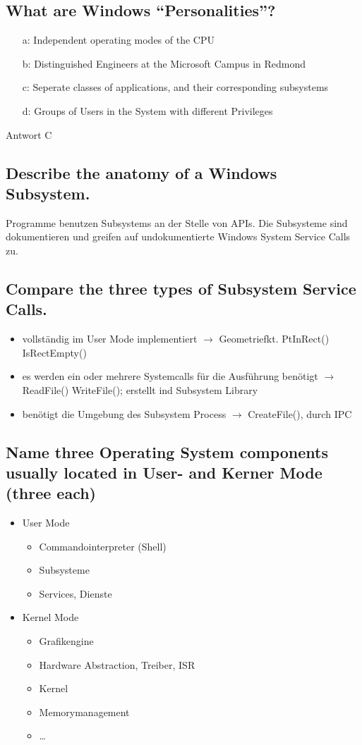 \subsection{What are Windows ``Personalities''?}
\begin{enumerate}
	\item[a:] Independent operating modes of the CPU
	\item[b:] Distinguished Engineers at the Microsoft Campus in Redmond
	\item[c:] Seperate classes of applications, and their corresponding subsystems
	\item[d:] Groups of Users in the System with different Privileges
\end{enumerate}
Antwort C

\subsection{Describe the anatomy of a Windows Subsystem.}
Programme benutzen Subsystems an der Stelle von APIs. Die Subsysteme sind dokumentieren und greifen auf undokumentierte Windows System Service Calls zu.

\subsection{Compare the three types of Subsystem Service Calls.}
\begin{itemize}
	\setlength\itemsep{-0.5em}
	\item vollst\"andig im User Mode implementiert $\rightarrow$ Geometriefkt. PtInRect() IsRectEmpty()
	\item es werden ein oder mehrere Systemcalls f\"ur die Ausf\"uhrung ben\"otigt $\rightarrow$ ReadFile() WriteFile(); erstellt ind Subsystem Library
	\item ben\"otigt die Umgebung des Subsystem Process $\rightarrow$ CreateFile(), durch IPC 
\end{itemize}

\subsection{Name three Operating System components usually located in User- and Kerner Mode (three each)}
\begin{itemize}
	\setlength\itemsep{-0.5em}
	\item User Mode
	\begin{itemize}
		\item Commandointerpreter (Shell)
		\item Subsysteme
		\item Services, Dienste
	\end{itemize}
	\item Kernel Mode
	\begin{itemize}
		\item Grafikengine
		\item Hardware Abstraction, Treiber, ISR
		\item Kernel
		\item Memorymanagement
		\item \dots
	\end{itemize}
\end{itemize}

